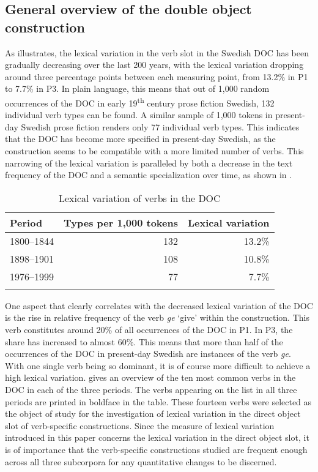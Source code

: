 \documentclass[output=paper]{langscibook}
\begin{document}
\subsection{General overview of the double object construction}\label{sec:valdeson:5.1}


As  illustrates, the lexical variation in the verb slot in the Swedish DOC has been gradually decreasing over the last 200 years, with the lexical variation dropping around three percentage points between each measuring point, from 13.2\% in P1 to 7.7\% in P3. In plain language, this means that out of 1,000 random occurrences of the DOC in early 19\textsuperscript{th} century prose fiction Swedish, 132 individual verb types can be found. A similar sample of 1,000 tokens in present-day Swedish prose fiction renders only 77 individual verb types. This indicates that the DOC has become more specified in present-day Swedish, as the construction seems to be compatible with a more limited number of verbs. This narrowing of the lexical variation is paralleled by both a decrease in the text frequency of the DOC and a semantic specialization over time, as shown in \textcite{ValdesonSubmitted}.


\begin{table}
\caption{Lexical variation of verbs in the DOC}
\label{tab:valdeson:4}
\begin{tabular}{lrr}
\lsptoprule
Period & Types per 1,000 tokens & Lexical variation\\
\midrule
1800–1844 & 132 & 13.2\%\\
1898–1901 & 108 & 10.8\%\\
1976–1999 & 77 & 7.7\%\\
\lspbottomrule
\end{tabular}
\end{table}

One aspect that clearly correlates with the decreased lexical variation of the DOC is the rise in relative frequency of the verb \textit{ge} ‘give’ within the construction. This verb constitutes around 20\% of all occurrences of the DOC in P1. In P3, the share has increased to almost 60\%. This means that more than half of the occurrences of the DOC in present-day Swedish are instances of the verb \textit{ge}. With one single verb being so dominant, it is of course more difficult to achieve a high lexical variation.  gives an overview of the ten most common verbs in the DOC in each of the three periods. The verbs appearing on the list in all three periods are printed in boldface in the table. These fourteen verbs were selected as the object of study for the investigation of lexical variation in the direct object slot of verb-specific constructions. Since the measure of lexical variation introduced in this paper concerns the lexical variation in the direct object slot, it is of importance that the verb-specific constructions studied are frequent enough across all three subcorpora for any quantitative changes to be discerned.
\end{document}
